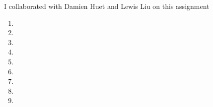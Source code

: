 \documentclass[letterpaper,11pt]{article}
\begin{document}
I collaborated with Damien Huet and Lewis Liu on this assignment
\begin{enumerate}
\item 
\item 
\item 
\item 
\item 
\item 
\item 
\item 
\item 
\end{enumerate}
\end{document}
